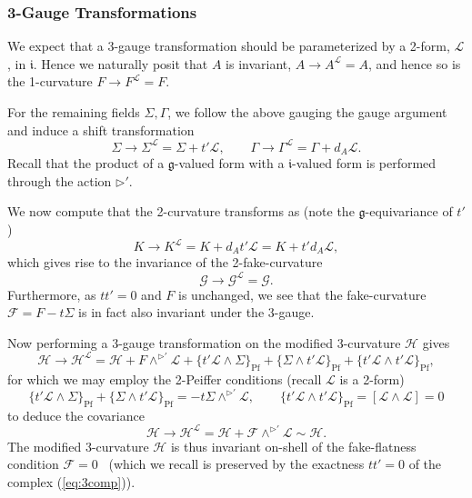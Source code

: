 \documentclass[onecolumn]{article}
\theoremstyle{theorem}
\theoremstyle{remark}
\theoremstyle{example}
\theoremstyle{definition}
\numberwithin{equation}{section}
\begin{document}

\subsubsection{3-Gauge Transformations} We expect that a   3-gauge transformation should be parameterized by a 2-form, $\mathcal{L}$, in $\mathfrak{i}$. Hence we naturally posit that $A$ is  invariant, $A\rightarrow A^\mathcal{L} = A$, and hence so is the 1-curvature $F\rightarrow F^\mathcal{L}=F$.

For the remaining fields $\Sigma,\Gamma$, we follow the above gauging the gauge argument and induce a shift transformation
\begin{equation}
    \Sigma\rightarrow\Sigma^\mathcal{L}=\Sigma+ t'\mathcal{L},\qquad \Gamma\rightarrow\Gamma^\mathcal{L}=\Gamma+d_A\mathcal{L}.\nonumber
\end{equation}
{Recall} that the product of a $\mathfrak{g}$-valued form with a $\mathfrak{i}$-valued form is performed through the action $\rhd'$. 

We now compute that the 2-curvature transforms as (note the $\mathfrak{g}$-equivariance of $t'$)
\begin{equation}
    K \rightarrow K^{\mathcal{L}} = K + d_At'\mathcal{L}= K+t'd_A\mathcal{L},\nonumber
\end{equation}
which gives rise to the { {invariance}} of the 2-fake-curvature
\begin{equation}
    \mathcal{G} \rightarrow \mathcal{G}^\mathcal{L} = \mathcal{G}.\label{2curv3gau}
\end{equation}
{Furthermore}, as $tt'=0$ and $F$ is unchanged, we see that the fake-curvature $\mathcal{F}=F-t\Sigma$ is in fact also invariant under the 3-gauge.

Now performing a 3-gauge transformation on the modified 3-curvature $\mathcal{H}$ gives
\begin{equation}
    \mathcal{H}\rightarrow \mathcal{H}^{\mathcal{L}} = \mathcal{H} + F\wedge^{\rhd'}\mathcal{L} + \{t'\mathcal{L}\wedge \Sigma\}_\text{Pf} + \{\Sigma\wedge t'\mathcal{L}\}_\text{Pf} + \{t'\mathcal{L}\wedge t'\mathcal{L}\}_\text{Pf},\nonumber
\end{equation}
for which we may employ the 2-Peiffer conditions (recall $\mathcal{L}$ is a 2-form)
\begin{equation}
    \{t'\mathcal{L}\wedge \Sigma\}_\text{Pf} + \{\Sigma\wedge t'\mathcal{L}\}_\text{Pf} = -t\Sigma\wedge^{\rhd'}\mathcal{L},\qquad  \{t'\mathcal{L}\wedge t'\mathcal{L}\}_\text{Pf} = [\mathcal{L}\wedge\mathcal{L}] =0\nonumber
\end{equation}
to deduce the covariance
\begin{equation}
    \mathcal{H}\rightarrow \mathcal{H}^{\mathcal{L}} = \mathcal{H}+ \mathcal{F}\wedge^{\rhd'} \mathcal{L} \sim \mathcal{H}.\label{3curv3gau}
\end{equation}
{The} modified 3-curvature $\mathcal{H}$ is thus invariant on-shell of the fake-flatness condition \mbox{$\mathcal{F}=0$}~\cite{Radenkovic:2021fqq} (which we recall is preserved by the exactness $tt'=0$ of the complex  (\ref{eq:3comp})).
 
\end{document}
